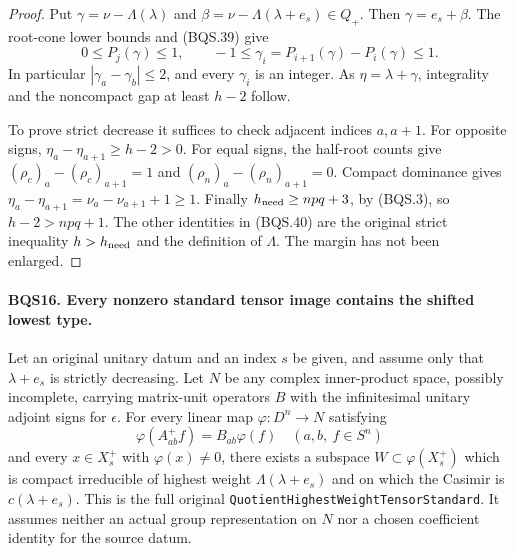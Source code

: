 \documentclass[11pt,a4paper]{article}
\numberwithin{equation}{section}
\theoremstyle{remark}\newtheorem{remark}[theorem]{Remark}
\begin{document}
\begin{proof}
Put $\gamma=\nu-\Lambda(\lambda)$ and
$\beta=\nu-\Lambda(\lambda+e_s)\in Q_+$.
Then $\gamma=e_s+\beta$.  The root-cone lower bounds and (BQS.39)
give
\[
        0\le P_j(\gamma)\le1,\qquad
        -1\le\gamma_i=P_{i+1}(\gamma)-P_i(\gamma)\le1.
 \tag{BQS.41}
\]
In particular $|\gamma_a-\gamma_b|\le2$, and every $\gamma_i$ is an
integer.  As $\eta=\lambda+\gamma$, integrality and the noncompact
gap at least $h-2$ follow.

To prove strict decrease it suffices to check adjacent indices $a,a+1$.
For opposite signs,
$\eta_a-\eta_{a+1}\ge h-2>0$.
For equal signs, the half-root counts give
$(\rho_c)_a-(\rho_c)_{a+1}=1$ and
$(\rho_n)_a-(\rho_n)_{a+1}=0$.
Compact dominance gives
$\eta_a-\eta_{a+1}=\nu_a-\nu_{a+1}+1\ge1$.
Finally $h_{\rm need}\ge npq+3$, by (BQS.3), so $h-2>npq+1$.
The other identities in (BQS.40) are the original strict inequality
$h>h_{\rm need}$ and the definition of $\Lambda$.
The margin has not been enlarged.
\end{proof}

\paragraph{BQS16. Every nonzero standard tensor image contains the shifted lowest type.}
\label{claim:BQS16}
Let an original unitary datum and an index $s$ be given, and assume only
that $\lambda+e_s$ is strictly decreasing.
Let $N$ be any complex inner-product space, possibly incomplete, carrying
matrix-unit operators $B$ with the infinitesimal unitary adjoint signs
for $\epsilon$.
For every linear map $\varphi:D^n\to N$ satisfying
\[
       \varphi(A^+_{ab}f)=B_{ab}\varphi(f)
                  \quad(a,b,\ f\in S^n)
 \tag{BQS.42}
\]
and every $x\in X_s^+$ with $\varphi(x)\ne0$, there exists a subspace
$W\subset\varphi(X_s^+)$ which is compact irreducible of highest weight
$\Lambda(\lambda+e_s)$ and on which the Casimir is $c(\lambda+e_s)$.
This is the full original \texttt{Quotient\allowbreak Highest\allowbreak Weight\allowbreak Tensor\allowbreak Standard}.
It assumes neither an actual group representation on $N$ nor a chosen
coefficient identity for the source datum.
\end{document}
